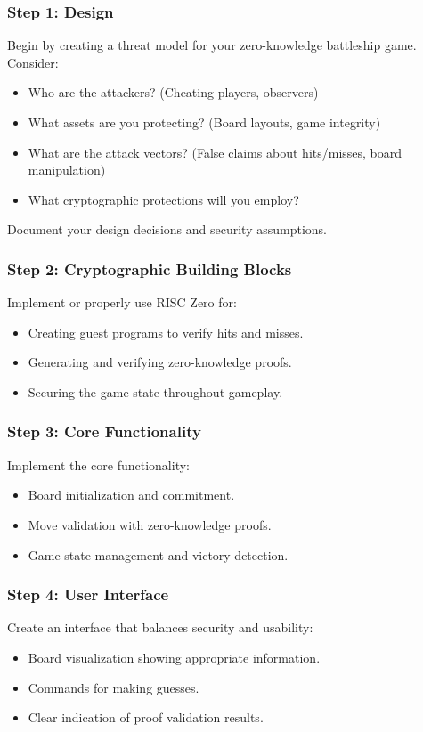 \documentclass[10pt,a4paper,american]{article}
\begin{document}
\subsubsection*{Step 1: Design}
Begin by creating a threat model for your zero-knowledge battleship game. Consider:
\begin{itemize}
	\item Who are the attackers? (Cheating players, observers)
	\item What assets are you protecting? (Board layouts, game integrity)
	\item What are the attack vectors? (False claims about hits/misses, board manipulation)
	\item What cryptographic protections will you employ?
\end{itemize}

Document your design decisions and security assumptions.

\subsubsection*{Step 2: Cryptographic Building Blocks}
Implement or properly use RISC Zero for:
\begin{itemize}
	\item Creating guest programs to verify hits and misses.
	\item Generating and verifying zero-knowledge proofs.
	\item Securing the game state throughout gameplay.
\end{itemize}

\subsubsection*{Step 3: Core Functionality}
Implement the core functionality:
\begin{itemize}
	\item Board initialization and commitment.
	\item Move validation with zero-knowledge proofs.
	\item Game state management and victory detection.
\end{itemize}

\subsubsection*{Step 4: User Interface}
Create an interface that balances security and usability:
\begin{itemize}
	\item Board visualization showing appropriate information.
	\item Commands for making guesses.
	\item Clear indication of proof validation results.
\end{itemize}
\end{document}
